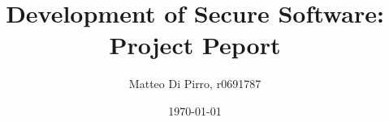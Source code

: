 \documentclass[a4paper,10pt]{article}
\begin{document}
\title{Development of Secure Software: Project Peport}
\author{Matteo Di Pirro, r0691787}
\date{\today}

\maketitle





\end{document}
